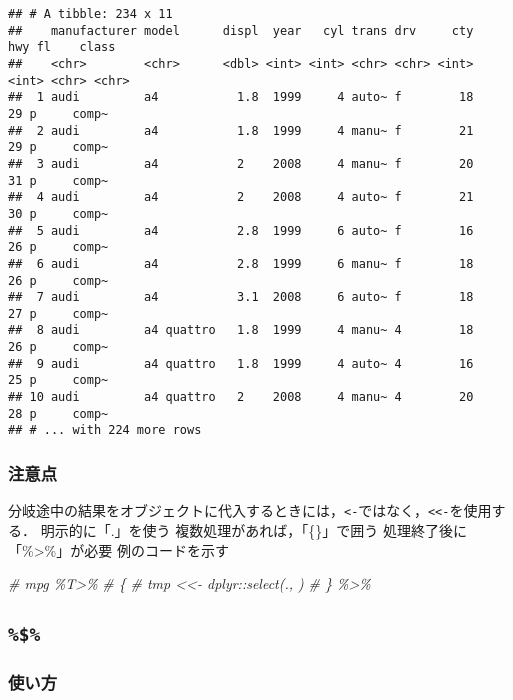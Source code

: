 \documentclass[
]{article}
\newenvironment{Shaded}{\begin{snugshade}}{\end{snugshade}}
\newcommand{\CommentTok}[1]{\textcolor[rgb]{0.56,0.35,0.01}{\textit{#1}}}
\begin{document}
\begin{verbatim}
## # A tibble: 234 x 11
##    manufacturer model      displ  year   cyl trans drv     cty   hwy fl    class
##    <chr>        <chr>      <dbl> <int> <int> <chr> <chr> <int> <int> <chr> <chr>
##  1 audi         a4           1.8  1999     4 auto~ f        18    29 p     comp~
##  2 audi         a4           1.8  1999     4 manu~ f        21    29 p     comp~
##  3 audi         a4           2    2008     4 manu~ f        20    31 p     comp~
##  4 audi         a4           2    2008     4 auto~ f        21    30 p     comp~
##  5 audi         a4           2.8  1999     6 auto~ f        16    26 p     comp~
##  6 audi         a4           2.8  1999     6 manu~ f        18    26 p     comp~
##  7 audi         a4           3.1  2008     6 auto~ f        18    27 p     comp~
##  8 audi         a4 quattro   1.8  1999     4 manu~ 4        18    26 p     comp~
##  9 audi         a4 quattro   1.8  1999     4 auto~ 4        16    25 p     comp~
## 10 audi         a4 quattro   2    2008     4 manu~ 4        20    28 p     comp~
## # ... with 224 more rows
\end{verbatim}

\hypertarget{ux6ce8ux610fux70b9-1}{%
\subsubsection{注意点}\label{ux6ce8ux610fux70b9-1}}

分岐途中の結果をオブジェクトに代入するときには，\texttt{\textless{}-}ではなく，\texttt{\textless{}\textless{}-}を使用する．
明示的に「.」を使う
複数処理があれば，「\{\}」で囲う
処理終了後に「\%\textgreater\%」が必要
例のコードを示す

\begin{Shaded}
\begin{Highlighting}[]
\CommentTok{\#  mpg \%T\textgreater{}\%}
\CommentTok{\#    \{}
\CommentTok{\#      tmp \textless{}\textless{}{-} dplyr::select(., ) }
\CommentTok{\#    \} \%\textgreater{}\%}
\end{Highlighting}
\end{Shaded}

\hypertarget{section-1}{%
\subsection{\texorpdfstring{\texttt{\%\$\%}}{\%\$\%}}\label{section-1}}

\hypertarget{ux4f7fux3044ux65b9-2}{%
\subsubsection{使い方}\label{ux4f7fux3044ux65b9-2}}
\end{document}
